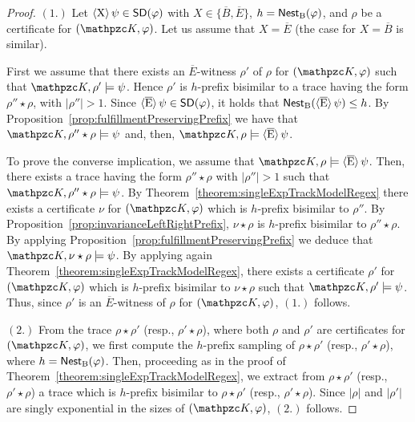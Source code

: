 \begin{proof} 
$(1.)$ Let $\operatorname{\langle X\rangle}\psi\in\textsf{SD}(\varphi)$  with $X\in \{\overline{B}, \overline{E}\}$, $h=\operatorname{\mathsf{Nest}_B}(\varphi)$, and $\rho$ be a certificate for $(\Ku,\varphi)$. Let us assume that $X= \overline{E}$  (the  case for $X= \overline{B}$ is similar). 

First we assume that there exists an  $\overline{E}$-witness $\rho'$ of $\rho$ for $(\Ku,\varphi)$ such that $\Ku,\rho'\models \psi$. Hence $\rho'$ is $h$-prefix bisimilar to a trace having the form $\rho''\star \rho$, with $|\rho''|>1$. Since $\operatorname{\langle \overline{E}\rangle}\psi\in\textsf{SD}(\varphi)$, it holds that
$\operatorname{\mathsf{Nest}_B}(\operatorname{\langle \overline{E}\rangle}\psi)\leq h$. By Proposition~\ref{prop:fulfillmentPreservingPrefix} we have that  $\Ku, \rho''\star \rho \models \psi$ and, then, $\Ku,\rho\models \hsEt\psi$.

To prove the converse implication, we assume that $\Ku,\rho\models \hsEt\psi$. Then, there exists a trace having the form $\rho''\star \rho$ with $|\rho''|>1$ such that
$\Ku,\rho''\star\rho\models \psi$. By Theorem~\ref{theorem:singleExpTrackModelRegex} there exists a certificate $\nu$ for $(\Ku,\varphi)$ which is $h$-prefix bisimilar
to $\rho''$. By Proposition~\ref{prop:invarianceLeftRightPrefix}, $\nu\star \rho$ is $h$-prefix bisimilar to  $\rho''\star\rho$. By applying Proposition~\ref{prop:fulfillmentPreservingPrefix} we deduce that $\Ku,\nu\star\rho\models \psi$. By applying again Theorem~\ref{theorem:singleExpTrackModelRegex}, there exists
a certificate $\rho'$ for $(\Ku,\varphi)$ which is $h$-prefix bisimilar to  $\nu\star \rho$ such that $\Ku,\rho'\models \psi$. Thus, since $\rho'$ is an
$\overline{E}$-witness of $\rho$ for $(\Ku,\varphi)$, $(1.)$ follows. 

$(2.)$ From the trace $\rho\star\rho'$ (resp., $\rho'\star\rho$), where both $\rho$ and $\rho'$ are certificates for $(\Ku,\varphi)$, we first compute the $h$-prefix sampling of $\rho\star\rho'$ (resp., $\rho'\star\rho$), where $h=\operatorname{\mathsf{Nest}_B}(\varphi)$. Then, proceeding as in the proof of Theorem~\ref{theorem:singleExpTrackModelRegex}, we extract from
$\rho\star\rho'$ (resp., $\rho'\star\rho$) a trace which is $h$-prefix bisimilar to $\rho\star\rho'$ (resp., $\rho'\star\rho$). Since $|\rho|$ and $|\rho'|$ are singly exponential in the sizes of $(\Ku,\varphi)$, $(2.)$ follows.
\end{proof}


